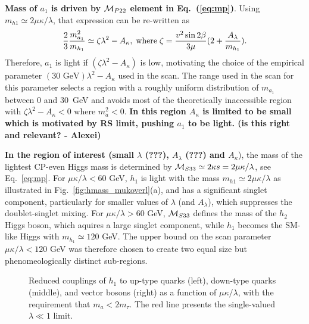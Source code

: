 \documentclass[aps,prl,nofootinbib,superscriptaddress]{revtex4}
\def\CM{{\cal M}}
\begin{document}
{\bf Mass of $a_1$ is driven by $\CM_{P22}$ element in Eq.~(\ref{eq:mp})}. Using $m_{h1}\simeq 2\mu\kappa/\lambda$, 
that expression can be re-written as
\begin{eqnarray}
{{2}\over{3}} {{m_{a_1}^2}\over{m_{h_1}}} \simeq  \zeta \lambda^2 - A_\kappa, \; {\rm where} \; \zeta = {{v^2\sin 2\beta}\over{3\mu}} (2+{{A_\lambda}\over{m_{h_1}}}) \nonumber.
\end{eqnarray}
Therefore, $a_1$ is light if $(\zeta \lambda^2 - A_\kappa)$ is low, motivating the choice of the empirical parameter 
$(\mbox{30~GeV})\lambda^2-A_\kappa$ used in the scan. The range used in the scan for this parameter selects a region 
with a roughly uniform distribution of $m_{a_1}$ between 0 and 30~GeV and avoids most of the theoretically inaccessible 
region with $\zeta\lambda^2-A_\kappa<0$ where $m_a^2<0$. {\bf In this region $A_\kappa$ is limited to be small 
which is motivated by RS limit, pushing $a_1$ to be light. (is this right and relevant? - Alexei)}

{\bf In the region of interest (small $\lambda$ (???), $A_\lambda$ (???) and $A_\kappa$}), the mass of the lightest 
CP-even Higgs mass is determined by $\CM_{S33} \simeq 2\kappa s = 2\mu\kappa/\lambda$, see Eq.~\ref{eq:mp}. For 
$\mu\kappa/\lambda<60$ GeV, $h_1$ is light with the mass $m_{h1}\simeq 2\mu\kappa/\lambda$ as illustrated in 
Fig.~\ref{fig:hmass_mukoverl}(a), and has a significant singlet component, particularly for smaller values of 
$\lambda$ (and $A_\lambda$), which suppresses the doublet-singlet mixing. For $\mu \kappa/\lambda>60$ GeV,
$\CM_{S33}$ defines the mass of the $h_2$ Higgs boson, which aquires a large singlet component, while $h_1$ 
becomes the SM-like Higgs with $m_{h_1}\simeq120$ GeV. The upper bound on the scan parameter $\mu \kappa /\lambda<120$ GeV 
was therefore chosen to create two equal size but phenomeologically distinct sub-regions.

\begin{figure*}[thb]
\caption{Reduced couplings of $h_1$ to up-type quarks (left), down-type
  quarks (middle), and vector bosons (right) as a function of $\mu\kappa/\lambda$, with
  the requirement that $m_a < 2m_\tau$.  The red line presents the
  single-valued $\lambda \ll 1$ limit. \label{fig:sm_mukoverl1}}
\end{figure*}
\end{document}
